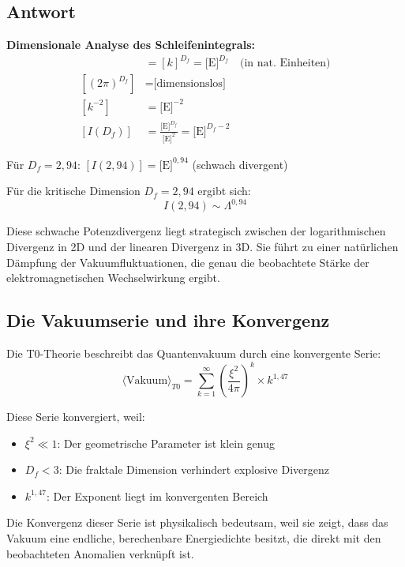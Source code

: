 \documentclass[12pt,a4paper]{article}
\theoremstyle{remark}
\newenvironment{answer}{\subsection*{Antwort}}{\vspace{1em}}
\begin{document}
\begin{answer}
	\begin{units}
		\textbf{Dimensionale Analyse des Schleifenintegrals:}
		\begin{align}
			[d^{D_f} k] &= [k]^{D_f} = \text{[E]}^{D_f} \quad \text{(in nat. Einheiten)} \\
			[(2\pi)^{D_f}] &= \text{[dimensionslos]} \\
			[k^{-2}] &= \text{[E]}^{-2} \\
			[I(D_f)] &= \frac{\text{[E]}^{D_f}}{\text{[E]}^2} = \text{[E]}^{D_f-2}
		\end{align}
		
		Für $D_f = 2{,}94$: $[I(2{,}94)] = \text{[E]}^{0{,}94}$ (schwach divergent)
	\end{units}
	
	Für die kritische Dimension $D_f = 2{,}94$ ergibt sich:
	\begin{equation}
		I(2{,}94) \sim \Lambda^{0{,}94}
	\end{equation}
	
	Diese schwache Potenzdivergenz liegt strategisch zwischen der logarithmischen Divergenz in 2D und der linearen Divergenz in 3D. Sie führt zu einer natürlichen Dämpfung der Vakuumfluktuationen, die genau die beobachtete Stärke der elektromagnetischen Wechselwirkung ergibt.
	
	\subsection{Die Vakuumserie und ihre Konvergenz}
	
	Die T0-Theorie beschreibt das Quantenvakuum durch eine konvergente Serie:
	\begin{equation}
		\langle \text{Vakuum} \rangle_{T0} = \sum_{k=1}^{\infty} \left(\frac{\xi^2}{4\pi}\right)^k \times k^{1{,}47}
	\end{equation}
	
	Diese Serie konvergiert, weil:
	\begin{itemize}
		\item $\xi^2 \ll 1$: Der geometrische Parameter ist klein genug
		\item $D_f < 3$: Die fraktale Dimension verhindert explosive Divergenz
		\item $k^{1{,}47}$: Der Exponent liegt im konvergenten Bereich
	\end{itemize}
	
	Die Konvergenz dieser Serie ist physikalisch bedeutsam, weil sie zeigt, dass das Vakuum eine endliche, berechenbare Energiedichte besitzt, die direkt mit den beobachteten Anomalien verknüpft ist.


\end{answer}
\end{document}
